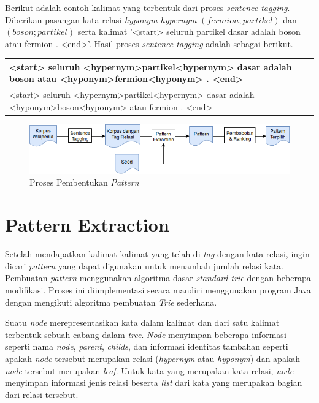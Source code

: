 Berikut adalah contoh kalimat yang terbentuk dari proses \textit{sentence tagging}. Diberikan pasangan kata relasi \textit{hyponym-hypernym} $(fermion;partikel)$ dan $(boson;partikel)$ serta kalimat  '<start> seluruh partikel dasar adalah boson atau fermion . <end>'. Hasil proses \textit{sentence tagging} adalah sebagai berikut.
\begin{center}
  \begin{tabular}{ | m{32em} | } 
  \hline
    <start> seluruh <hypernym>partikel<hypernym> dasar adalah boson atau <hyponym>fermion<hyponym> . <end> \\ \hline
    <start> seluruh <hypernym>partikel<hypernym> dasar adalah <hyponym>boson<hyponym> atau fermion . <end> \\ \hline
  \end{tabular}
\end{center}

\begin{figure}
    \centering
    \includegraphics[width=\linewidth]{pics/Pic03-PatternExtraction}
    \caption{Proses Pembentukan \textit{Pattern}}
    \label{fig:pattern-extraction}
\end{figure}

\section{Pattern Extraction}
Setelah mendapatkan kalimat-kalimat yang telah di-\textit{tag} dengan kata relasi, ingin dicari \textit{pattern} yang dapat digunakan untuk menambah jumlah relasi kata. Pembuatan \textit{pattern} menggunakan algoritma dasar \textit{standard trie} dengan beberapa modifikasi. Proses ini diimplementasi secara mandiri menggunakan program Java dengan mengikuti algoritma pembuatan \textit{Trie} sederhana.

Suatu \textit{\textit{node}} merepresentasikan kata dalam kalimat dan dari satu kalimat terbentuk sebuah cabang dalam \textit{tree}. \textit{Node} menyimpan beberapa informasi seperti nama \textit{\textit{node}}, \textit{parent}, \textit{childs}, dan informasi identitas tambahan seperti apakah \textit{\textit{node}} tersebut merupakan relasi (\textit{hypernym} atau \textit{hyponym}) dan apakah \textit{\textit{node}} tersebut merupakan \textit{leaf}. Untuk kata yang merupakan kata relasi, \textit{\textit{node}} menyimpan informasi jenis relasi beserta \textit{list} dari kata yang merupakan bagian dari relasi tersebut. 

